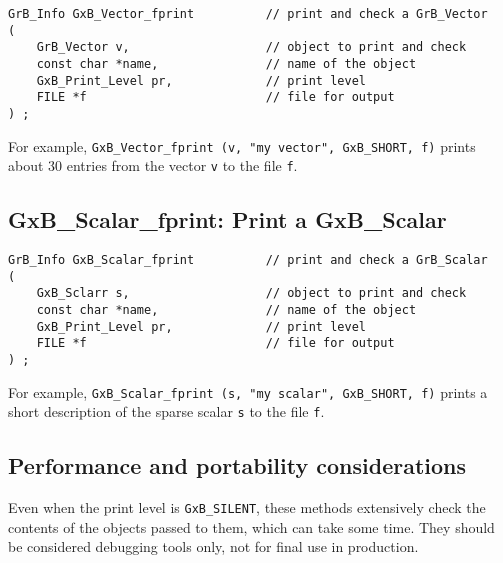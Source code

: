 \documentclass[12pt]{article}
\begin{document}
\begin{mdframed}[userdefinedwidth=6in]
{\footnotesize
\begin{verbatim}
GrB_Info GxB_Vector_fprint          // print and check a GrB_Vector
(
    GrB_Vector v,                   // object to print and check
    const char *name,               // name of the object
    GxB_Print_Level pr,             // print level
    FILE *f                         // file for output
) ;
\end{verbatim} } \end{mdframed}

For example, \verb'GxB_Vector_fprint (v, "my vector", GxB_SHORT, f)'
prints about 30 entries from the vector \verb'v' to the file \verb'f'.

\subsection{{\sf GxB\_Scalar\_fprint:} Print a {\sf GxB\_Scalar}}

\begin{mdframed}[userdefinedwidth=6in]
{\footnotesize
\begin{verbatim}
GrB_Info GxB_Scalar_fprint          // print and check a GrB_Scalar
(
    GxB_Sclarr s,                   // object to print and check
    const char *name,               // name of the object
    GxB_Print_Level pr,             // print level
    FILE *f                         // file for output
) ;
\end{verbatim} } \end{mdframed}

For example, \verb'GxB_Scalar_fprint (s, "my scalar", GxB_SHORT, f)'
prints a short description of the sparse scalar \verb's' to the file \verb'f'.

\newpage
\subsection{Performance and portability considerations}

Even when the print level is \verb'GxB_SILENT', these methods extensively check
the contents of the objects passed to them, which can take some time.  They
should be considered debugging tools only, not for final use in production.
\end{document}
